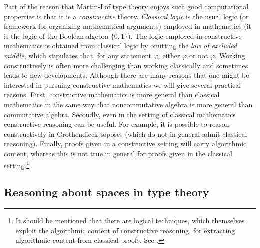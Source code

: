 \documentclass[11pt]{amsart}
\theoremstyle{definition}
\theoremstyle{remark}
\numberwithin{equation}{section}
\begin{document}
Part of the reason that Martin-L\"{o}f type theory enjoys such good
computational properties is that it is a \emph{constructive} theory.
\emph{Classical logic} is the usual logic (or framework for
organizing mathematical arguments) employed in mathematics (it is the
logic of the Boolean algebra $\{0,1\}$).  The logic employed in
constructive mathematics is obtained from classical logic by omitting
the \emph{law of excluded middle}, which stipulates that, for any
statement $\varphi$, either $\varphi$ or not $\varphi$.  Working
constructively is often more challenging than working classically and
sometimes leads to new developments.  Although there are many reasons that one
might be interested in pursuing constructive mathematics we will give
several practical reasons.  First, constructive mathematics is more
general than classical mathematics in the same way that noncommutative
algebra is more general than commutative algebra.  Secondly, even in
the setting of classical mathematics constructive reasoning can be
useful.  For example, it is possible to reason constructively in
Grothendieck toposes (which do not in general admit classical
reasoning).  Finally, proofs given in a constructive setting will
carry algorithmic content, whereas this is not true in general for
proofs given in the classical setting.\footnote{It should be mentioned
  that there are logical techniques, which themselves exploit the algorithmic content of constructive reasoning, for
  extracting algorithmic content from classical proofs.  See \cite{Kohlenbach:APT}.}

\subsection{Reasoning about spaces in type theory}
\end{document}
